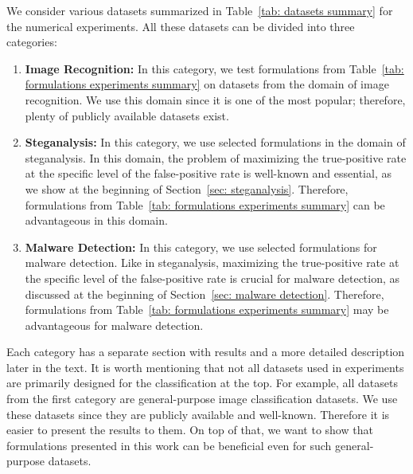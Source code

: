 We consider various datasets summarized in Table~\ref{tab: datasets summary} for the numerical experiments. All these datasets can be divided into three categories:
\begin{enumerate}
  \item \textbf{Image Recognition:} In this category, we test formulations from Table~\ref{tab: formulations experiments summary} on datasets from the domain of image recognition. We use this domain since it is one of the most popular; therefore, plenty of publicly available datasets exist.
  \item \textbf{Steganalysis:} In this category, we use selected formulations in the domain of steganalysis. In this domain, the problem of maximizing the true-positive rate at the specific level of the false-positive rate is well-known and essential, as we show at the beginning of Section~\ref{sec: steganalysis}. Therefore, formulations from Table~\ref{tab: formulations experiments summary} can be advantageous in this domain.
  \item \textbf{Malware Detection:} In this category, we use selected formulations for malware detection. Like in steganalysis, maximizing the true-positive rate at the specific level of the false-positive rate is crucial for malware detection, as discussed at the beginning of Section~\ref{sec: malware detection}. Therefore, formulations from Table~\ref{tab: formulations experiments summary} may be advantageous for malware detection.
\end{enumerate}
Each category has a separate section with results and a more detailed description later in the text. It is worth mentioning that not all datasets used in experiments are primarily designed for the classification at the top. For example, all datasets from the first category are general-purpose image classification datasets. We use these datasets since they are publicly available and well-known. Therefore it is easier to present the results to them. On top of that, we want to show that formulations presented in this work can be beneficial even for such general-purpose datasets.

